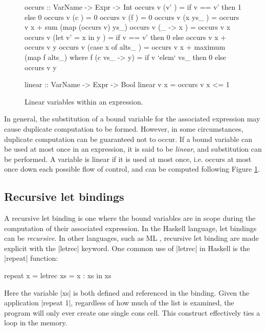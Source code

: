 \begin{figure}
\begin{code}
occurs :: VarName -> Expr -> Int
occurs v (v'                ) = if v == v' then 1 else 0
occurs v (c                 ) = 0
occurs v (f                 ) = 0
occurs v (x ys_             ) = occurs v x + sum (map (occurs v) ys_)
occurs v (\vs_ -> x         ) = occurs v x
occurs v (let v' = x in y   ) = if v == v' then 0 else occurs v x + occurs v y
occurs v (case x of alts_   ) = occurs v x + maximum (map f alts_)
    where f (c vs_ -> y) = if v `elem` vs_ then 0 else occurs v y

linear :: VarName -> Expr -> Bool
linear v x = occurs v x <= 1
\end{code}
\caption{Linear variables within an expression.}
\label{fig:linear}
\end{figure}

In general, the substitution of a bound variable for the associated expression may cause duplicate computation to be formed. However, in some circumstances, duplicate computation can be guaranteed not to occur. If a bound variable can be used at most once in an expression, it is said to be \textit{linear}, and substitution can be performed. A variable is linear if it is used at most once, i.e. occurs at most once down each possible flow of control, and can be computed following Figure \ref{fig:linear}.

\subsection{Recursive let bindings}

A recursive let binding is one where the bound variables are in scope during the computation of their associated expression. In the Haskell language, let bindings can be \textit{recursive}. In other languages, such as ML \cite{ml}, recursive let binding are made explicit with the |letrec| keyword. One common use of |letrec| in Haskell is the |repeat| function:

\begin{example}
\label{ex:repeat}
\begin{code}
repeat x =  letrec xs = x : xs
            in xs
\end{code}

Here the variable |xs| is both defined and referenced in the binding. Given the application |repeat 1|, regardless of how much of the list is examined, the program will only ever create one single cons cell. This construct effectively ties a loop in the memory.
\end{example}

